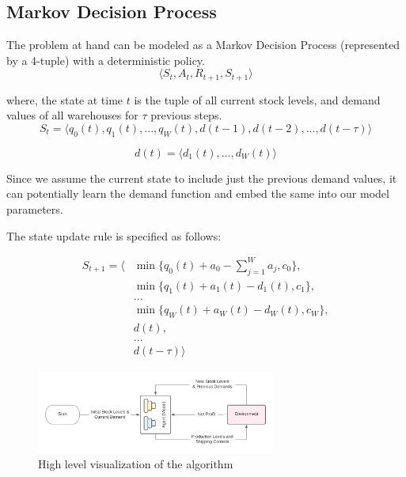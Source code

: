 \documentclass{article}
\begin{document}
\pagebreak

\subsection{Markov Decision Process}

The problem at hand can be modeled as a Markov Decision Process (represented by a 4-tuple) with a deterministic policy.
\begin{equation}
    \langle S_t, A_t, R_{t+1}, S_{t+1} \rangle 
\end{equation}


where, the state at time $t$ is the tuple of all current stock levels, and demand values of all warehouses for $\tau$ previous steps.
\begin{equation}
    S_t = \langle q_0(t), q_1(t), ..., q_W(t), d(t-1), d(t-2), ..., d(t-\tau) \rangle
\end{equation}

\begin{equation}
    d(t) = \langle d_1(t), ..., d_W(t) \rangle
\end{equation}

Since we assume the current state to include just the previous demand values, it can potentially learn the demand function and embed the same into our model parameters.

The state update rule is specified as follows: 

\begin{equation}
    \begin{split}
    S_{t+1} = \langle & \min \{ q_0(t) + a_0 - \sum_{j = 1}^W a_j, c_0 \}, \\
                      & \min \{ q_1(t) + a_1(t) - d_1(t), c_1 \}, \\
                      & ... \\
                      & \min \{ q_W(t) + a_W(t) - d_W(t), c_W \}, \\
                      & d(t), \\
                      & ... \\
                      & d(t - \tau) \rangle
    \end{split} 
\end{equation}




\begin{figure}[h]
    \centering
    \includegraphics[width=0.7\textwidth]{RL.png}
    \caption{High level visualization of the algorithm}
\end{figure}
\end{document}
